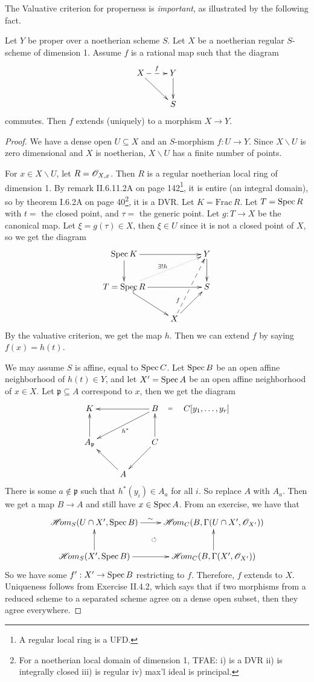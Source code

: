 The Valuative criterion for properness is \emph{important}, as
illustrated by the following fact.

Let
$Y$ be proper over a noetherian scheme $S$. Let $X$ be a
noetherian regular $S$-scheme of dimension 1. Assume $f$ is a
rational map such that the diagram
\[\xymatrix{
X\ar@{-->}[r]^f \ar[dr]&Y\ar[d]\\
& S }\] commutes.  Then $f$ extends (uniquely) to a morphism $X\to
Y$.
\begin{proof}
We have a dense open $U\subseteq X$ and an $S$-morphism $f:U\to
Y$.  Since $X\smallsetminus U$ is zero dimensional and $X$ is
noetherian, $X\smallsetminus U$ has a finite number of points.

For $x\in X\smallsetminus U$, let $R=\mathscr{O}_{X,x}$.  Then $R$ is a
regular noetherian local ring of dimension 1.  By remark
II.6.11.2A on page 142\footnote{A regular local ring is a UFD.},
it is entire (an integral domain), so by theorem I.6.2A on page
40\footnote{For a noetherian local domain of dimension 1, TFAE: i)
is a DVR ii) is integrally closed iii) is regular iv) max'l ideal
is principal.}, it is a DVR. Let $K=\text{Frac}\, R$. Let $T=\text{\rm Spec\,}
R$ with $t=$ the closed point, and $\tau=$ the generic point.  Let
$g:T\to X$ be the canonical map.  Let $\xi=g(\tau)\in X$, then
$\xi\in U$ since it is not a closed point of $X$, so we get the
diagram
\[\xymatrix{
 \spec K \ar[rr] \ar[d] & & Y\ar[d]\\
 T=\spec R \ar[rr]\ar@{^(->}[dr] \ar@{.>}[urr]^{\exists !h}& & S\\
 & X  \ar[ur] \ar@{-->}[uur]^(.25){f}|!{[ur];[ul]}{\hole}
}\] By the valuative criterion, we get the map $h$.  Then we can
extend $f$ by saying $f(x)=h(t)$.

We may assume $S$ is affine, equal to $\text{\rm Spec\,} C$.  Let $\text{\rm Spec\,} B$ be
an open affine neighborhood of $h(t)\in Y$, and let $X'=\text{\rm Spec\,} A$
be an open affine neighborhood of $x\in X$.  Let
$\mathfrak{p}\subseteq A$ correspond to $x$, then we get the
diagram
\[\xymatrix{
 K & & B \ar[ll] \ar[dll]^{h^*} \ar@{}[r]|(.3){=} & C[y_1,\dots,y_r]  \\
 A_{\mathfrak{p}}\ar[u] &  & C\ar[ld]\ar[u]\\
 & A \ar[lu]
 }\]
 There is some $a\not\in \mathfrak{p}$ such that $h^*(y_i)\in A_a$
 for all $i$.  So replace $A$ with $A_a$.  Then we get a map $B\to
 A$ and still have $x\in \text{\rm Spec\,} A$.  From an exercise, we have that
 \[\xymatrix{
  \Hom_S(U\cap X',\spec B) \ar[r]^(.47){\sim} \ar@{}[dr]|{\circlearrowleft} & \Hom_C(B,\Gamma(U\cap
  X',\O_{X'})) \\
  \Hom_S(X',\spec B) \ar[u] \ar[r] & \Hom_C(B,\Gamma(X',\O_{X'}))
  \ar[u]
 }\]
So we have some $f':X'\to \text{\rm Spec\,} B$ restricting to $f$.  Therefore,
$f$ extends to $X$.  Uniqueness follows from Exercise II.4.2,
which says that if two morphisms from a reduced scheme to a
separated scheme agree on a dense open subset, then they agree
everywhere.
\end{proof}

